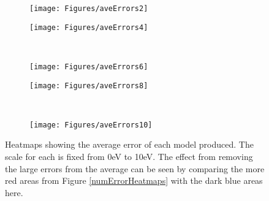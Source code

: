 \begin{figure*}
  \begin{subfigure}{0.5\textwidth}
    \texttt{[image: Figures/aveErrors2]}
    \caption{} 
    \label{aveErrors2}
  \end{subfigure}%
  \hspace*{\fill}   %
  \begin{subfigure}{0.5\textwidth}
    \texttt{[image: Figures/aveErrors4]}
    \caption{} 
    \label{aveErrors4}
  \end{subfigure}%
    \\
  \begin{subfigure}{0.5\textwidth}
    \texttt{[image: Figures/aveErrors6]}
    \caption{} 
    \label{aveErrors6}
  \end{subfigure}%
    \hspace*{\fill}   %
  \begin{subfigure}{0.5\textwidth}
    \texttt{[image: Figures/aveErrors8]}
    \caption{} 
    \label{aveErrors8}
  \end{subfigure}%
    \\
  \begin{subfigure}{0.5\textwidth}
    \texttt{[image: Figures/aveErrors10]}
    \caption{} 
    \label{aveErrors10}
  \end{subfigure}%
\caption{Heatmaps showing the average error of each model produced. The scale for each is fixed from 0eV to 10eV. The effect from removing the large errors from the average can be seen by comparing the more red areas from Figure \ref{numErrorHeatmaps} with the dark blue areas here.}
\label{aveErrorHeatmaps}
\end{figure*}


